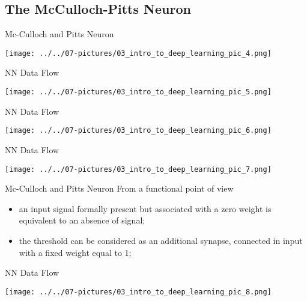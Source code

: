 \documentclass[11pt]{beamer}
\begin{document}
\subsection{The McCulloch-Pitts Neuron \\ \scalebox{0.8}{	}}
\begin{frame}{Mc-Culloch and Pitts Neuron}
	\begin{center}
	\texttt{[image: ../../07-pictures/03\_intro\_to\_deep\_learning\_pic\_4.png]}
	\end{center}
\end{frame}
\begin{frame}{NN Data Flow}
	\begin{center}
	\texttt{[image: ../../07-pictures/03\_intro\_to\_deep\_learning\_pic\_5.png]}
	\end{center}
\end{frame}
\begin{frame}{NN Data Flow}
	\begin{center}
	\texttt{[image: ../../07-pictures/03\_intro\_to\_deep\_learning\_pic\_6.png]}
	\end{center}
\end{frame}
\begin{frame}{NN Data Flow}
	\begin{center}
	\texttt{[image: ../../07-pictures/03\_intro\_to\_deep\_learning\_pic\_7.png]}
	\end{center}
\end{frame}
\begin{frame}{Mc-Culloch and Pitts Neuron}
From a functional point of view
	\begin{itemize}
		\item an input signal formally present but associated with a zero weight is equivalent to an absence of signal;
		\item the threshold can be considered as an additional synapse, connected in input with a fixed weight equal to 1;
	\end{itemize}
\end{frame}
\begin{frame}{NN Data Flow}
	\begin{center}
	\texttt{[image: ../../07-pictures/03\_intro\_to\_deep\_learning\_pic\_8.png]}
	\end{center}
\end{frame}
\end{document}

